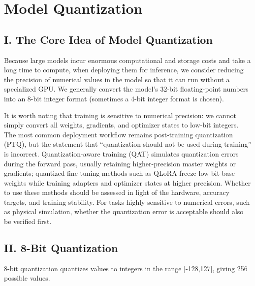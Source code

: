 \setcounter{section}{0}

\hypertarget{model-quantization}{%
\section{Model Quantization}\label{model-quantization}}

\hypertarget{i.-the-core-idea-of-model-quantization}{%
\subsection{I. The Core Idea of Model Quantization}\label{i.-the-core-idea-of-model-quantization}}

Because large models incur enormous computational and storage costs and take a long time to compute, when deploying them for inference, we consider reducing the precision of numerical values in the model so that it can run without a specialized GPU. We generally convert the model's 32-bit floating-point numbers into an 8-bit integer format (sometimes a 4-bit integer format is chosen).

It is worth noting that training is sensitive to numerical precision: we cannot simply convert all weights, gradients, and optimizer states to low-bit integers. The most common deployment workflow remains post-training quantization (PTQ), but the statement that ``quantization should not be used during training'' is incorrect. Quantization-aware training (QAT) simulates quantization errors during the forward pass, usually retaining higher-precision master weights or gradients; quantized fine-tuning methods such as QLoRA freeze low-bit base weights while training adapters and optimizer states at higher precision. Whether to use these methods should be assessed in light of the hardware, accuracy targets, and training stability. For tasks highly sensitive to numerical errors, such as physical simulation, whether the quantization error is acceptable should also be verified first.

\hypertarget{ii.-8-bit-quantization}{%
\subsection{II. 8-Bit Quantization}\label{ii.-8-bit-quantization}}

8-bit quantization quantizes values to integers in the range {[}-128,127{]}, giving 256 possible values.


